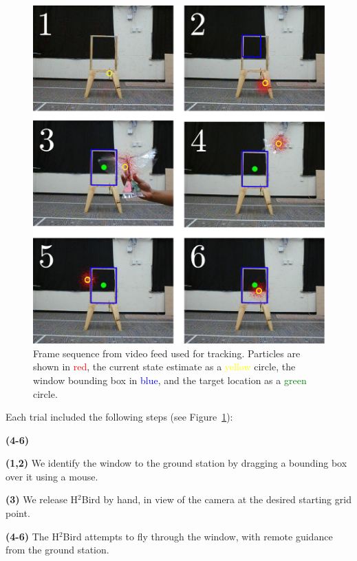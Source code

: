 \documentclass{aamas2013}
\newenvironment{spaced_description}[1]
  {\begin{list}{}%
   {\renewcommand\makelabel[1]{##1:\hfill}%
   \settowidth\labelwidth{\makelabel{#1}}%
   \setlength\leftmargin{\labelwidth}
   \addtolength\leftmargin{\labelsep}}}
  {\end{list}}
\begin{document}
\begin{figure}[tb]
\centering
\includegraphics[width=\linewidth]{figures/pf_screencap.pdf}
\caption{Frame sequence from video feed used for tracking. Particles 
are shown in \textcolor{red}{red}, the current state estimate as a 
\textcolor{yellow}{yellow} circle, the window bounding box in
\textcolor{blue}{blue}, and the target location as a \textcolor{green}{green} 
circle.}
\label{fig:pf_screencap}
\end{figure}

Each trial included the following steps (see Figure~\ref{fig:pf_screencap}):
\begin{spaced_description}{\textbf{(4-6)}}
\item[\textbf{(1,2)}] We identify the window to the ground station by dragging a bounding 
box over it using a mouse. 
\item[\textbf{(3)}] We release H$^2$Bird by hand, in view of the camera at the desired 
starting grid point.
\item[\textbf{(4-6)}] The H$^2$Bird attempts to fly through the window, with remote 
guidance from the ground station.
\end{spaced_description}
\end{document}
